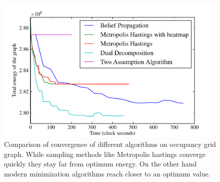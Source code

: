 \documentclass[letterpaper, 10 pt, conference]{ieeeconf} %
\begin{document}
\begin{figure}
  \includegraphics[width=\columnwidth]{../figures/relativeconvergence.pdf}%
  \caption{Comparison of convergence of different algorithms on occupancy grid graph. While sampling methods like Metropolis hastings converge quickly they stay far from optimum energy. On the other hand modern minimization algorithms reach closer to an optimum value.}
  \label{fig:convergence-comparison}
\end{figure}
\end{document}
